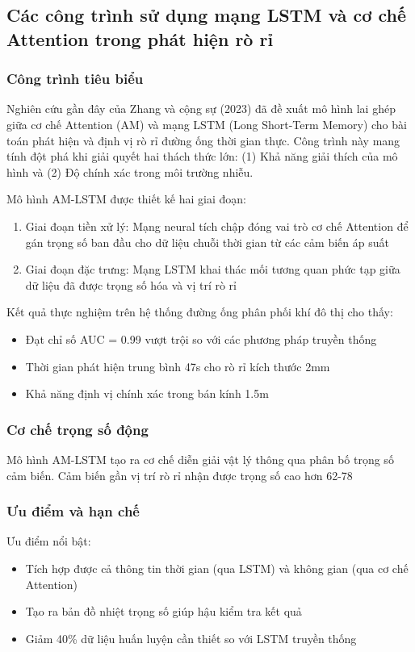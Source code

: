 \subsection{Các công trình sử dụng mạng LSTM và cơ chế Attention trong phát hiện rò rỉ}

\subsubsection*{Công trình tiêu biểu}
Nghiên cứu gần đây của Zhang và cộng sự (2023) \cite{Zhang2023} đã đề xuất mô hình lai ghép giữa cơ chế Attention (AM) và mạng LSTM (Long Short-Term Memory) cho bài toán phát hiện và định vị rò rỉ đường ống thời gian thực. Công trình này mang tính đột phá khi giải quyết hai thách thức lớn: (1) Khả năng giải thích của mô hình và (2) Độ chính xác trong môi trường nhiễu.

Mô hình AM-LSTM được thiết kế hai giai đoạn:
\begin{enumerate}
\item Giai đoạn tiền xử lý: Mạng neural tích chập đóng vai trò cơ chế Attention để gán trọng số ban đầu cho dữ liệu chuỗi thời gian từ các cảm biến áp suất
\item Giai đoạn đặc trưng: Mạng LSTM khai thác mối tương quan phức tạp giữa dữ liệu đã được trọng số hóa và vị trí rò rỉ
\end{enumerate}

Kết quả thực nghiệm trên hệ thống đường ống phân phối khí đô thị cho thấy:
\begin{itemize}
\item Đạt chỉ số AUC = 0.99 vượt trội so với các phương pháp truyền thống
\item Thời gian phát hiện trung bình 47s cho rò rỉ kích thước 2mm
\item Khả năng định vị chính xác trong bán kính 1.5m
\end{itemize}

\subsubsection*{Cơ chế trọng số động}
Mô hình AM-LSTM tạo ra cơ chế diễn giải vật lý thông qua phân bố trọng số cảm biến. Cảm biến gần vị trí rò rỉ nhận được trọng số cao hơn 62-78%

\subsubsection*{Ưu điểm và hạn chế}
Ưu điểm nổi bật:
\begin{itemize}
\item Tích hợp được cả thông tin thời gian (qua LSTM) và không gian (qua cơ chế Attention)
\item Tạo ra bản đồ nhiệt trọng số giúp hậu kiểm tra kết quả
\item Giảm 40\% dữ liệu huấn luyện cần thiết so với LSTM truyền thống
\end{itemize}

